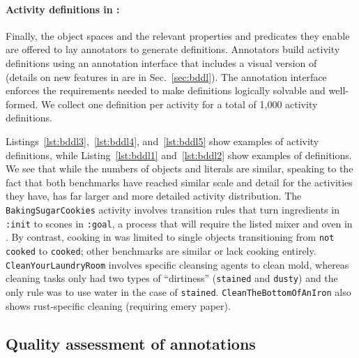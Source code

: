 \paragraph{Activity definitions in \bddl:} Finally, the object spaces and the relevant properties and predicates they enable are offered to lay annotators to generate \bddl definitions. Annotators build activity definitions using an annotation interface that includes a visual version of \bddl~\cite{srivastava2021behavior} (details on new features in \bddl are in  Sec.~\ref{sec:bddl}). The annotation interface enforces the requirements needed to make definitions logically solvable and well-formed. We collect one definition per activity for a total of 1,000 \bddl activity definitions.

Listings~\ref{lst:bddl3},~\ref{lst:bddl4}, and~\ref{lst:bddl5} show examples of \benchmark activity definitions, while Listing~\ref{lst:bddl1} and~\ref{lst:bddl2} show examples of \oldbenchmark definitions. We see that while the numbers of objects and literals are similar, speaking to the fact that both benchmarks have reached similar scale and detail for the activities they have, \benchmark has far larger and more detailed activity distribution. The \texttt{BakingSugarCookies} activity involves transition rules that turn ingredients in \texttt{:init} to scones in \texttt{:goal}, a process that will require the listed mixer and oven in \simulator. By contrast, cooking in \oldbenchmark was limited to single objects transitioning from \texttt{not cooked} to \texttt{cooked}; other benchmarks are similar or lack cooking entirely. \texttt{CleanYourLaundryRoom} involves specific cleansing agents to clean mold, whereas \oldbenchmark cleaning tasks only had two types of ``dirtiness'' (\texttt{stained} and \texttt{dusty}) and the only rule was to use water in the case of \texttt{stained}. \texttt{CleanTheBottomOfAnIron} also shows rust-specific cleaning (requiring emery paper).

\subsection{Quality assessment of \benchmark annotations}
\label{sec:annot_qa}

